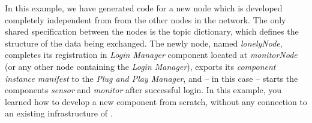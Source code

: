 In this example, we have generated code for a new node which is developed completely independent from from the other nodes in the network.
The only shared specification between the nodes is the topic dictionary, which defines the structure of the data being exchanged.
%
The newly node, named \emph{lonelyNode}, completes its registration in \emph{Login Manager} component
located at \emph{monitorNode} (or any other node containing the \emph{Login Manager}),
exports its \emph{component instance manifest} to the \emph{Plug and Play Manager},
and -- in this case -- starts the components \emph{sensor} and \emph{monitor} after successful login.
%
In this example, you learned how to develop a new component from scratch, without any connection to an existing infrastructure of \xme.
